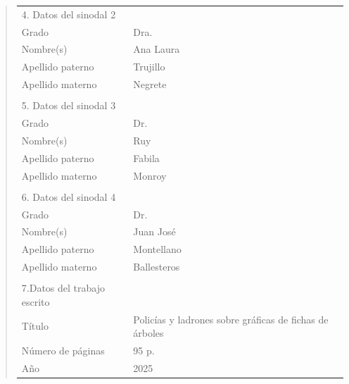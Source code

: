 {\begin{quote}
\begin{tabular}{lll}
4. Datos del sinodal 2      & {}                                          \\
Grado                       & Dra.                                        \\
Nombre(s)                   & Ana Laura                                   \\
Apellido paterno            & Trujillo                                    \\
Apellido materno            & Negrete                                     \\
{}                          & {}                                          \\
5. Datos del sinodal 3      & {}                                          \\
Grado                       & Dr.                                         \\
Nombre(s)                   & Ruy                                         \\
Apellido paterno            & Fabila                                      \\
Apellido materno            & Monroy                                      \\
{}                          & {}                                          \\
6. Datos del sinodal 4      & {}                                          \\
Grado                       & Dr.                                         \\
Nombre(s)                   & Juan Jos\'e                                 \\
Apellido paterno            & Montellano                                  \\
Apellido materno            & Ballesteros                                 \\
{}                          & {}                                          \\
7.Datos del trabajo escrito & {}                                          \\
T\'itulo                    & Polic\'ias y ladrones sobre gr\'aficas de fichas de \'arboles                                  \\
N\'umero de p\'aginas       & 95 p.                                       \\
A\~no                       & 2025                                        \\
\end{tabular}
\end{quote}
}
